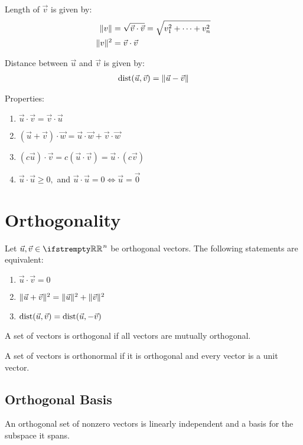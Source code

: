 \documentclass[12pt, a4paper]{article}
\begin{document}
\begin{multicols*}{3}
Length of $\vec{v}$  is given by:
\begin{align*}
  \lVert v\rVert &= \sqrt{\vec{v}\cdot\vec{v}} = \sqrt{v^2_1 + \cdots + v^2_n}\\
  \lVert v\rVert^2 &= \vec{v}\cdot\vec{v}
\end{align*}

Distance between $\vec{u}$ and $\vec{v}$ is given by:
\begin{align*}
  \operatorname{dist}(\vec{u}, \vec{v}) = \lVert\vec{u} - \vec{v}\rVert
\end{align*}

Properties:
\begin{enumerate}[\roman*.]
  \item $\vec{u} \cdot \vec{v} = \vec{v} \cdot \vec{u}$
  \item $(\vec{u} + \vec{v}) \cdot \vec{w} = \vec{u} \cdot \vec{w} + \vec{v} \cdot \vec{w}$
  \item $(c \vec{u}) \cdot \vec{v} = c (\vec{u} \cdot \vec{v}) = \vec{u} \cdot (c \vec{v})$
  \item $\vec{u} \cdot \vec{u} \geq 0,$ and $\vec{u} \cdot \vec{u} = 0 \iff \vec{u} = \vec{0}$
\end{enumerate}
\colbreak

\section{Orthogonality}

Let $\vec{u}, \vec{v} \in \RR^n$ be orthogonal vectors. The following statements are equivalent:
\begin{enumerate}[\roman*.]
  \item $\vec{u} \cdot \vec{v} = 0$
  \item $\lVert\vec{u} + \vec{v}\rVert^2 = \lVert\vec{u}\rVert^2 + \lVert\vec{v}\rVert^2$
  \item $\operatorname{dist}(\vec{u}, \vec{v}) = \operatorname{dist}(\vec{u}, -\vec{v})$
\end{enumerate}

A set of vectors is orthogonal if all vectors are mutually orthogonal.

A set of vectors is orthonormal if it is orthogonal and every vector is a unit vector.

\subsection{Orthogonal Basis}
An orthogonal set of nonzero vectors is linearly independent and a basis for the subspace it spans. 


\end{multicols*}
\end{document}
